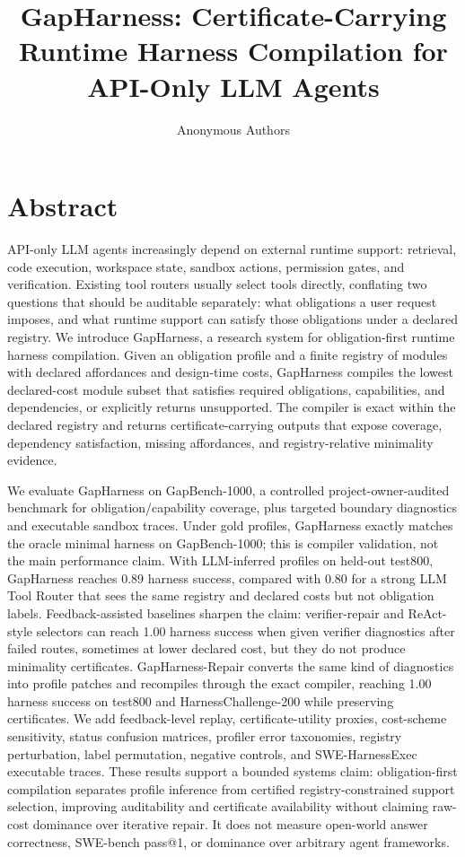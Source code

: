 \documentclass[
  10pt,
]{article}
\title{GapHarness: Certificate-Carrying Runtime Harness Compilation for
API-Only LLM Agents}
\author{Anonymous Authors}
\date{}
\begin{document}
\maketitle

\section{Abstract}\label{abstract}

API-only LLM agents increasingly depend on external runtime support:
retrieval, code execution, workspace state, sandbox actions, permission
gates, and verification. Existing tool routers usually select tools
directly, conflating two questions that should be auditable separately:
what obligations a user request imposes, and what runtime support can
satisfy those obligations under a declared registry. We introduce
GapHarness, a research system for obligation-first runtime harness
compilation. Given an obligation profile and a finite registry of
modules with declared affordances and design-time costs, GapHarness
compiles the lowest declared-cost module subset that satisfies required
obligations, capabilities, and dependencies, or explicitly returns
unsupported. The compiler is exact within the declared registry and
returns certificate-carrying outputs that expose coverage, dependency
satisfaction, missing affordances, and registry-relative minimality
evidence.

We evaluate GapHarness on GapBench-1000, a controlled
project-owner-audited benchmark for obligation/capability coverage, plus
targeted boundary diagnostics and executable sandbox traces. Under gold
profiles, GapHarness exactly matches the oracle minimal harness on
GapBench-1000; this is compiler validation, not the main performance
claim. With LLM-inferred profiles on held-out test800, GapHarness
reaches 0.89 harness success, compared with 0.80 for a strong LLM Tool
Router that sees the same registry and declared costs but not obligation
labels. Feedback-assisted baselines sharpen the claim: verifier-repair
and ReAct-style selectors can reach 1.00 harness success when given
verifier diagnostics after failed routes, sometimes at lower declared
cost, but they do not produce minimality certificates. GapHarness-Repair
converts the same kind of diagnostics into profile patches and
recompiles through the exact compiler, reaching 1.00 harness success on
test800 and HarnessChallenge-200 while preserving certificates. We add
feedback-level replay, certificate-utility proxies, cost-scheme
sensitivity, status confusion matrices, profiler error taxonomies,
registry perturbation, label permutation, negative controls, and
SWE-HarnessExec executable traces. These results support a bounded
systems claim: obligation-first compilation separates profile inference
from certified registry-constrained support selection, improving
auditability and certificate availability without claiming raw-cost
dominance over iterative repair. It does not measure open-world answer
correctness, SWE-bench pass@1, or dominance over arbitrary agent
frameworks.
\end{document}
